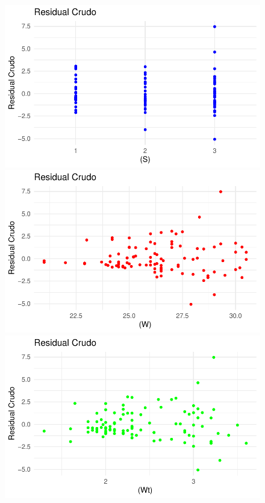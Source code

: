 \documentclass[
  letterpaper,
  DIV=11,
  numbers=noendperiod]{scrartcl}
\begin{document}
\begin{figure}

\begin{minipage}{0.50\linewidth}
\includegraphics{Modelos_files/figure-pdf/unnamed-chunk-26-1.pdf}\end{minipage}%
%
\begin{minipage}{0.50\linewidth}
\includegraphics{Modelos_files/figure-pdf/unnamed-chunk-26-2.pdf}\end{minipage}%
\newline
\begin{minipage}{0.50\linewidth}
\includegraphics{Modelos_files/figure-pdf/unnamed-chunk-26-3.pdf}\end{minipage}%

\end{figure}
\end{document}
